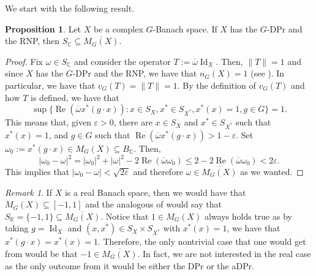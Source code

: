 \documentclass[a4paper,12pt]{amsart}
\theoremstyle{definition}
\newtheorem{proposition}[theorem]{Proposition}
\theoremstyle{definition}
\theoremstyle{remark}
\newtheorem{remark}[theorem]{Remark}
\numberwithin{equation}{section}
\newcommand{\R}{\mathbb{R}}
\newcommand{\C}{\mathbb{C}}
\DeclareMathOperator{\re}{Re}
\DeclareMathOperator{\id}{Id}
\renewcommand{\leq}{\leqslant}
\newcommand{\<}{\langle}
\renewcommand{\>}{\rangle}
\newcommand{\e}{\varepsilon}
\begin{document}
	
	
	We start with the following result.
	
	
	\begin{proposition} \label{MG(X)-result} Let $X$ be a complex $G$-Banach space. If $X$ has the $G$-DPr and the RNP, then $S_{\C} \subseteq \overline{M_G(X)}$.
	\end{proposition}
	
	\begin{proof} Fix $\omega \in S_{\C}$ and consider the operator $T:=\overline{\omega} \id_X$. Then, $\|T\| = 1$ and since $X$ has the $G$-DPr and the RNP, we have that $n_{G}(X) = 1$ (see ). In particular, we have that $v_G(T) = \|T\| = 1$. By the definition of $v_G(T)$ and how $T$ is defined, we have that 
		\begin{equation*}
			\sup \{ \re (\overline{\omega} x^*(g \cdot x)): x \in S_X, x^* \in S_{X^*}, x^*(x) = 1, g \in G \} = 1.
		\end{equation*}
		This means that, given $\e > 0$, there are $x \in S_X$ and $x^* \in S_{X^*}$ such that $x^*(x) = 1$, and $g \in G$ such that $\re (\overline{\omega} x^*(g \cdot x)) > 1 - \e$. Set $\omega_0:= x^*(g \cdot x) \in M_G(X) \subseteq B_{\C}$. Then,
		\begin{equation*}
			|\omega_0 - \omega|^2 = |\omega_0|^2 + |\omega|^2 - 2 \re (\overline{\omega} \omega_0) \leq 2 - 2 \re (\overline{\omega} \omega_0) < 2 \e. 
		\end{equation*}
		This implies that $|\omega_0 - \omega| < \sqrt{2\e}$ and therefore $\omega \in \overline{M_G(X)}$ as we wanted. 
	\end{proof}
	
	
	\begin{remark} %
		
		If $X$ is a real Banach space, then we would have that $M_G(X) \subseteq [-1,1]$ and the analogous of  would say that $S_{\R} = \{-1,1\} \subseteq \overline{M_G(X)}$. Notice that $1 \in M_G(X)$ always holds true as by taking $g = \id_X$ and $(x, x^*) \in S_X \times S_{X^*}$ with $x^*(x) = 1$, we have that $x^*(g \cdot x) = x^*(x) = 1$. Therefore, the only nontrivial case that one would get from  would be that $-1 \in \overline{M_G(X)}$. In fact, we are not interested in the real case as the only outcome from it would be either the DPr or the aDPr.
		
	\end{remark}
	
\end{document}
